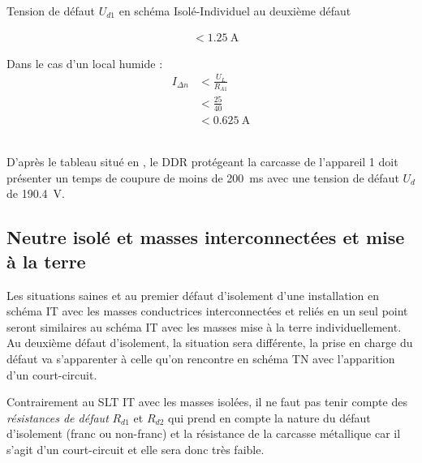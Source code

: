 \begin{exemple}{Tension de défaut $U_{d1}$ en schéma Isolé-Individuel au deuxième défaut}{}
\begin{minipage}[t]{0.5\linewidth}
\begin{align*}
						&< \SI{1,25}{\ampere}
\end{align*}
\end{minipage}
\hfill
\begin{minipage}[t]{0.5\linewidth}
Dans le cas d'un local humide :
\begin{align*}
	I_{\Delta n} 	&< \frac{U_{L}}{R_{A1}} \\
						&< \frac{25}{40} \\
						&< \SI{0,625}{\ampere}
\end{align*}
\end{minipage}
~\\
D'après le tableau situé en , le DDR protégeant la carcasse de l'appareil 1 doit présenter un temps de coupure de moins de \SI{200}{\milli\second} avec une tension de défaut $U_d$ de \SI{190,4}{\volt}.
\end{exemple}

\subsection{Neutre isolé et masses interconnectées et mise à la terre}

Les situations saines et au premier défaut d'isolement d'une installation en schéma IT avec les masses conductrices interconnectées et reliés en un seul point seront similaires au schéma IT avec les masses mise à la terre individuellement. Au deuxième défaut d'isolement, la situation sera différente, la prise en charge du défaut va s'apparenter à celle qu'on rencontre en schéma TN avec l'apparition d'un court-circuit.

 \begin{figure}[H]
\caption{Installation Isolé-Interconnectée}
\begin{subfigure}[t]{0.49\linewidth}

\end{subfigure}
\begin{subfigure}[t]{0.49\linewidth}

\end{subfigure}
\end{figure}

Contrairement au SLT IT avec les masses isolées, il ne faut pas tenir compte des \emph{résistances de défaut} $R_{d1}$ et $R_{d2}$ qui prend en compte la nature du défaut d'isolement (franc ou non-franc) et la résistance de la carcasse métallique car il s'agit d'un court-circuit et elle sera donc très faible.\\

